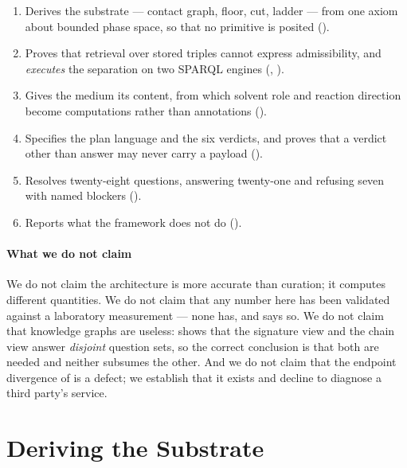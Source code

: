 \documentclass[11pt,twocolumn,a4paper]{article}
\theoremstyle{thmstyle}
\theoremstyle{definition}
\theoremstyle{remark}
\newcommand{\vans}{\textsf{answer}}
\begin{document}
\begin{enumerate}[label=(\roman*),leftmargin=2.4em,itemsep=3pt]
\item Derives the substrate --- contact graph, floor, cut, ladder --- from one
      axiom about bounded phase space, so that no primitive is posited
      ().
\item Proves that retrieval over stored triples cannot express admissibility,
      and \emph{executes} the separation on two SPARQL engines
      (, ).
\item Gives the medium its content, from which solvent role and reaction
      direction become computations rather than annotations
      ().
\item Specifies the plan language and the six verdicts, and proves that a
      verdict other than \vans{} may never carry a payload
      ().
\item Resolves twenty-eight questions, answering twenty-one and refusing seven
      with named blockers ().
\item Reports what the framework does not do ().
\end{enumerate}

\subsection{What we do not claim}
\label{sec:notclaim}

We do not claim the architecture is more accurate than curation; it computes
different quantities. We do not claim that any number here has been validated
against a laboratory measurement --- none has, and  says so.
We do not claim that knowledge graphs are useless:  shows
that the signature view and the chain view answer \emph{disjoint} question
sets, so the correct conclusion is that both are needed and neither subsumes
the other. And we do not claim that the endpoint divergence of
 is a defect; we establish that it exists and decline to
diagnose a third party's service.

\part{Deriving the Substrate}
\end{document}
